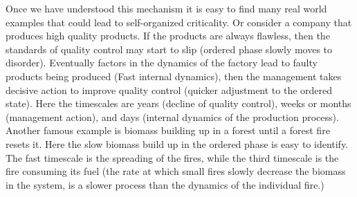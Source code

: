 Once we have understood this mechanism it is easy to find many real world examples that could lead to self-organized criticality. Or consider a company that produces high quality products. If the products are always flawless, then the standards of quality control may start to slip (ordered phase slowly moves to disorder). Eventually factors in the dynamics of the factory lead to faulty products being produced (Fast internal dynamics), then the management takes decisive action to improve quality control (quicker adjustment to the ordered state). Here the timescales are years (decline of quality control), weeks or months (management action), and days (internal dynamics of the production process). Another famous example is biomass building up in a forest until a forest fire resets it. Here the slow biomass build up in the ordered phase is easy to identify. The fast timescale is the spreading of the fires, while the third timescale is the fire consuming its fuel (the rate at which small fires slowly decrease the biomass in the system, is a slower process than the dynamics of the individual fire.)
